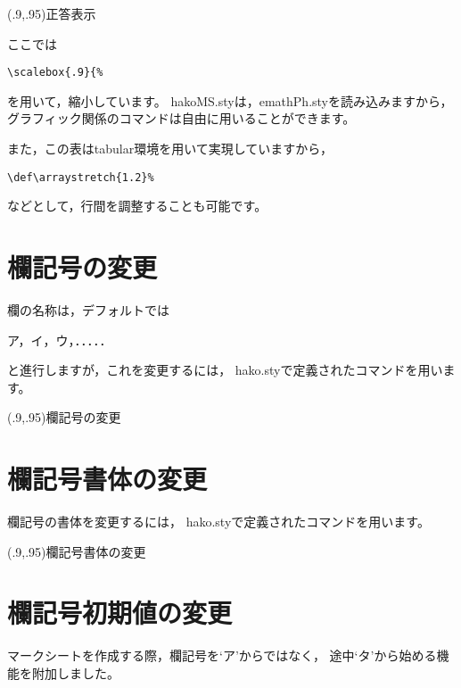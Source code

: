 \documentclass[a4j]{jarticle}
\begin{document}
\begin{showEx}(.9,.95){正答表示}
\def\arraystretch{1.2}%
%
\end{showEx}

ここでは
\begin{jquote}
\begin{verbatim}
\scalebox{.9}{%
\end{verbatim}
\end{jquote}
を用いて，縮小しています。
\textsf{hakoMS.sty}は，\textsf{emathPh.sty}を読み込みますから，
グラフィック関係のコマンドは自由に用いることができます。

また，この表は\textsf{tabular}環境を用いて実現していますから，
\begin{jquote}
\begin{verbatim}
\def\arraystretch{1.2}%
\end{verbatim}
\end{jquote}
などとして，行間を調整することも可能です。
\newpage

\section{欄記号の変更}
欄の名称は，デフォルトでは
\begin{jquote}
ア，イ，ウ，．．．．．
\end{jquote}
と進行しますが，これを変更するには，
\textsf{hako.sty}で定義されたコマンドを用います。

\begin{showEx}(.9,.95){欄記号の変更}
\end{showEx}

\section{欄記号書体の変更}
欄記号の書体を変更するには，
\textsf{hako.sty}で定義されたコマンドを用います。

\begin{showEx}(.9,.95){欄記号書体の変更}
\hakosyotai{\sffamily}
\end{showEx}
\newpage

\section{欄記号初期値の変更}
マークシートを作成する際，欄記号を`ア'からではなく，
途中`タ'から始める機能を附加しました。
\end{document}
